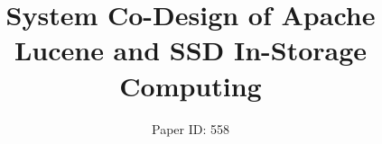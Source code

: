 
\title{System Co-Design of Apache Lucene and SSD In-Storage Computing}




\author{Paper ID: 558}

\maketitle






%












